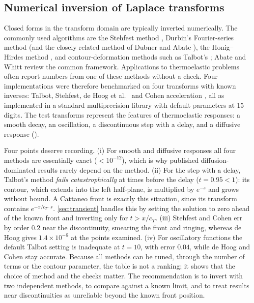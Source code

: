 \subsection{Numerical inversion of Laplace transforms}\label{sec:inversion}
Closed forms in the transform domain are typically inverted numerically. The commonly used algorithms are the Stehfest method \citep{Stehfest1970}, Durbin's Fourier-series method \citep{Durbin1974} (and the closely related method of Dubner and Abate \citep{DubnerAbate1968}), the Honig--Hirdes method \citep{HonigHirdes1984}, and contour-deformation methods such as Talbot's \citep{Talbot1979}; Abate and Whitt \citep{AbateWhitt2006} review the common framework. Applications to thermoelastic problems often report numbers from one of these methods without a check. Four implementations were therefore benchmarked on four transforms with known inverses: Talbot, Stehfest, de Hoog et al.\ \citep{deHoog1982} and Cohen acceleration \citep{Cohen2007}, all as implemented in a standard multiprecision library with default parameters at 15 digits. The test transforms represent the features of thermoelastic responses: a smooth decay, an oscillation, a discontinuous step with a delay, and a diffusive response ().
\begin{table}[ht]\centering\small
\caption{Maximum absolute error of four numerical Laplace inversion methods on test transforms (evaluated at $t=0.5,2,5,10$; for the step at $t=0.5,0.95,1.05,2,5$). Default parameters, 15 digits. ``$4\times10^{193}$'' indicates a numerical blow-up.}\label{tab:bench}

\end{table}
Four points deserve recording. (i) For smooth and diffusive responses all four methods are essentially exact ($<10^{-12}$), which is why published diffusion-dominated results rarely depend on the method. (ii) For the step with a delay, Talbot's method \emph{fails catastrophically} at times before the delay ($t=0.95<1$): its contour, which extends into the left half-plane, is multiplied by $e^{-s}$ and grows without bound. A Cattaneo front is exactly this situation, since its transform contains $e^{-x/c_T\cdot s}$. \cref{sec:transient} handles this by setting the solution to zero ahead of the known front and inverting only for $t>x/c_T$. (iii) Stehfest and Cohen err by order $0.2$ near the discontinuity, smearing the front and ringing, whereas de Hoog gives $1.4\times10^{-6}$ at the points examined. (iv) For oscillatory functions the default Talbot setting is inadequate at $t=10$, with error $0.04$, while de Hoog and Cohen stay accurate. Because all methods can be tuned, through the number of terms or the contour parameter, the table is not a ranking; it shows that the choice of method and the checks matter. The recommendation is to invert with two independent methods, to compare against a known limit, and to treat results near discontinuities as unreliable beyond the known front position.

